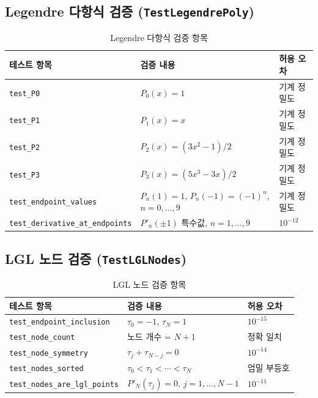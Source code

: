 \documentclass[11pt]{article}
\begin{document}
\subsection{Legendre 다항식 검증 (\texttt{TestLegendrePoly})}
\label{sec:test_legendre}

\begin{table}[htbp]
\centering
\caption{Legendre 다항식 검증 항목}
\label{tab:test_legendre}
\small
\begin{tabular}{@{}lll@{}}
\toprule
테스트 항목 & 검증 내용 & 허용 오차 \\
\midrule
\texttt{test\_P0} & $P_0(x) = 1$ & 기계 정밀도 \\
\texttt{test\_P1} & $P_1(x) = x$ & 기계 정밀도 \\
\texttt{test\_P2} & $P_2(x) = (3x^2 - 1)/2$ & 기계 정밀도 \\
\texttt{test\_P3} & $P_3(x) = (5x^3 - 3x)/2$ & 기계 정밀도 \\
\texttt{test\_endpoint\_values} & $P_n(1) = 1$, $P_n(-1) = (-1)^n$, $n = 0, \ldots, 9$ & 기계 정밀도 \\
\texttt{test\_derivative\_at\_endpoints} & $P'_n(\pm 1)$ 특수값, $n = 1, \ldots, 9$ & $10^{-12}$ \\
\bottomrule
\end{tabular}
\end{table}

\subsection{LGL 노드 검증 (\texttt{TestLGLNodes})}
\label{sec:test_nodes}

\begin{table}[htbp]
\centering
\caption{LGL 노드 검증 항목}
\label{tab:test_nodes}
\small
\begin{tabular}{@{}lll@{}}
\toprule
테스트 항목 & 검증 내용 & 허용 오차 \\
\midrule
\texttt{test\_endpoint\_inclusion} & $\tau_0 = -1$, $\tau_N = 1$ & $10^{-15}$ \\
\texttt{test\_node\_count} & 노드 개수 = $N + 1$ & 정확 일치 \\
\texttt{test\_node\_symmetry} & $\tau_j + \tau_{N-j} = 0$ & $10^{-14}$ \\
\texttt{test\_nodes\_sorted} & $\tau_0 < \tau_1 < \cdots < \tau_N$ & 엄밀 부등호 \\
\texttt{test\_nodes\_are\_lgl\_points} & $P'_N(\tau_j) = 0$, $j = 1, \ldots, N-1$ & $10^{-11}$ \\
\bottomrule
\end{tabular}
\end{table}
\end{document}
